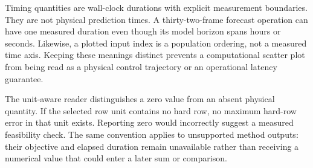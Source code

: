 Timing quantities are wall-clock durations with explicit measurement boundaries.
They are not physical prediction times. A thirty-two-frame forecast operation
can have one measured duration even though its model horizon spans hours or
seconds. Likewise, a plotted input index is a population ordering, not a measured
time axis. Keeping these meanings distinct prevents a computational scatter plot
from being read as a physical control trajectory or an operational latency guarantee.

The unit-aware reader distinguishes a zero value from an absent physical
quantity. If the selected row unit contains no hard row, no maximum hard-row
error in that unit exists. Reporting zero would incorrectly suggest a measured
feasibility check. The same convention applies to unsupported method outputs:
their objective and elapsed duration remain unavailable rather than receiving
a numerical value that could enter a later sum or comparison.
